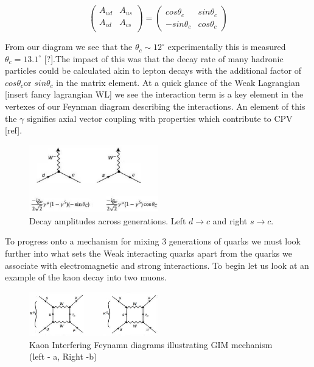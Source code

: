 \documentclass[floatfix,aps,prd,amsmath,amssymb]{revtex4}
\begin{document}
\[  \left( \begin{array}{ccc} 
A_{ud} & A_{us} \\
A_{cd} & A_{cs}  \\
\end{array} \right)
 = \left( \begin{array}{ccc}
 cos\theta_{c} & sin\theta_{c} \\
 -sin\theta_{c} & cos\theta_{c} \end{array} \right) \]

From our diagram we see that the $\theta_c\sim 12^{\circ}$ experimentally this is measured $\theta_c = 13.1^{\circ}$ [?].The impact of this was that the decay rate of many hadronic particles could be calculated akin to lepton decays with the additional factor of $cos\theta_c$or $sin\theta_c$ in the matrix element. At a quick glance of the Weak Lagrangian [insert fancy lagrangian WL] we see the interaction term is a key element in the vertexes of our Feynman diagram describing the interactions. An element of this the $\gamma$ signifies axial vector coupling with properties which contribute to CPV [ref].

\begin{figure}[h]
\centering
\includegraphics[width=0.5\textwidth]{figs/ckmfig2.jpg}
\caption{Decay amplitudes across generations. Left $d\rightarrow c$ and right $s\rightarrow c$.}
\label{fey1}
\end{figure}


To progress onto a mechanism for mixing 3 generations of quarks we must look further into what sets the Weak interacting quarks apart from the quarks we associate with electromagnetic and strong interactions. To begin let us look at an example of the kaon decay into two muons.
 
\begin{figure}[h]
\centering
\includegraphics[width=0.5\textwidth]{figs/ckmfig3.jpg}
\caption{Kaon Interfering Feynamn diagrams illustrating GIM mechanism (left - a, Right -b)}
\label{fey2}
\end{figure}
\end{document}
